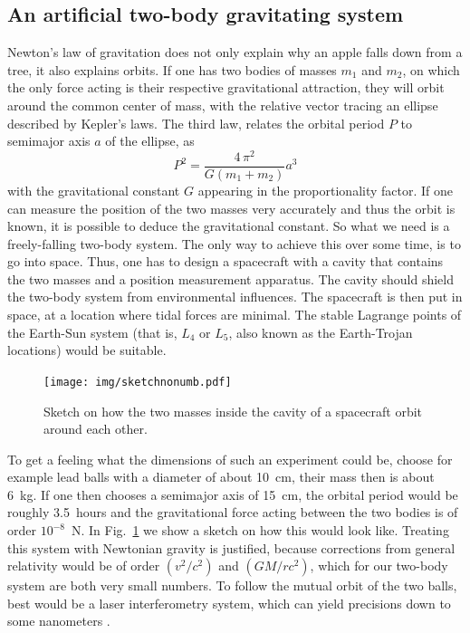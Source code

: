 \documentclass[]{rsos}
\begin{document}
\subsection{An artificial two-body gravitating system}
Newton's law of gravitation does not only explain why an apple falls
down from a tree, it also explains orbits. If one has two bodies of
masses $m_1$ and $m_2$, on which the only force acting is their
respective gravitational attraction, they will orbit around the common
center of mass, with the relative vector tracing an ellipse
described by Kepler's laws. The third law, relates the
orbital period $P$ to semimajor axis $a$ of the ellipse, as
\begin{equation}\label{eq:kepler3}
P^2 = \frac{4 \, \pi^2}{G(m_1+m_2)}a^3
\end{equation}
with the gravitational constant $G$ appearing in the proportionality
factor.  If one can measure the position of the two masses very
accurately and thus the orbit is known, it is possible to deduce the
gravitational constant.  So what we need is a freely-falling two-body
system. The only way to achieve this over some time, is to go into
space. Thus, one has to design a spacecraft with a cavity that
contains the two masses and a position measurement apparatus. The
cavity should shield the two-body system from environmental
influences. The spacecraft is then put in space, at a location where
tidal forces are minimal.  The stable Lagrange points of the Earth-Sun
system (that is, $L_4$ or $L_5$, also known as the Earth-Trojan
locations) would be suitable.

\begin{figure}
	\centering
	\texttt{[image: img/sketchnonumb.pdf]}
	\caption{Sketch on how the two masses inside the cavity of a spacecraft orbit around each other.}
	\label{fig:sketch}
\end{figure}

To get a feeling what the dimensions of such an experiment could be,
choose for example lead balls with a diameter of about 10~cm, their
mass then is about 6~kg. If one then chooses a semimajor axis of
15~cm, the orbital period would be roughly 3.5~hours and the
gravitational force acting between the two bodies is of order
$10^{-8}$~N.  In Fig.~\ref{fig:sketch} we show a sketch on how this
would look like. Treating this system with Newtonian gravity is justified, because corrections from general relativity would be of order $(v^2/c^2)$ and $(GM/rc^2)$, which for our two-body system are both very small numbers. To follow the mutual orbit of the two balls, best
would be a laser interferometry system, which can yield precisions
down to some nanometers \citep{Loughridge13}.
\end{document}
